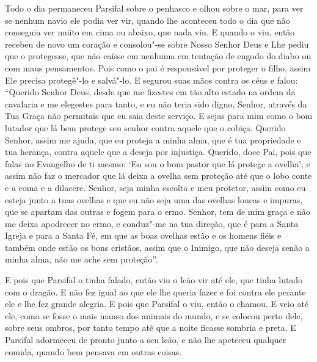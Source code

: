 Todo o dia permaneceu Parsifal sobre o penhasco e olhou sobre o mar, para
ver se nenhum navio ele podia ver vir, quando lhe aconteceu todo o dia que não
conseguia ver muito em cima ou abaixo, que nada viu. E quando o viu, então
recebeu de novo um coração e consolou"-se sobre Nosso Senhor Deus e Lhe pediu
que o protegesse, que não caísse em nenhuma em tentação de engodo do diabo ou
com maus pensamentos. Pois como o pai é responsável por proteger o filho, assim
Ele precisa protegê"-lo e salvá"-lo. E segurou suas mãos contra os céus e falou:
“Querido Senhor Deus, desde que me fizestes em tão alto estado na ordem da
cavalaria e me elegestes para tanto, e eu não teria sido digno, Senhor, através
da Tua Graça não permitais que eu saia deste serviço. E sejas para mim como o
bom lutador que lá bem protege seu senhor contra aquele que o cobiça. Querido
Senhor, assim me ajuda, que eu proteja a minha alma, que é tua propriedade e
tua herança, contra aquele que a deseja por injustiça. Querido, doce Pai, pois
que falas no Evangelho de ti mesmo: ‘Eu sou o bom pastor que lá protege a
ovelha’, e assim não faz o mercador que lá deixa a ovelha sem proteção até que
o lobo conte e a coma e a dilacere. Senhor, seja minha escolta e meu protetor,
assim como eu esteja junto a tuas ovelhas e que eu não seja uma das ovelhas
loucas e impuras, que se apartam das outras e fogem para o ermo. Senhor, tem de
mim graça e não me deixa apodrecer no ermo, e conduz"-me na tua direção, que é
para a Santa Igreja e para a Santa Fé, em que as boas ovelhas estão e os homens
fiéis e também onde estão os bons cristãos, assim que o Inimigo, que não deseja
senão a minha alma, não me ache sem proteção”. 

E pois que Parsifal o tinha falado, então viu o leão vir até ele, que tinha
lutado com o dragão. E não fez igual ao que ele lhe queria fazer e foi contra
ele perante ele e lhe fez grande alegria. E pois que Parsifal o viu, então o
chamou. E veio até ele, como se fosse o mais manso dos animais do mundo, e se
colocou perto dele, sobre seus ombros, por tanto tempo até que a noite ficasse
sombria e preta. E Parsifal adormeceu de pronto junto a seu leão, e não lhe
apeteceu qualquer comida, quando bem pensava em outras coisas.

